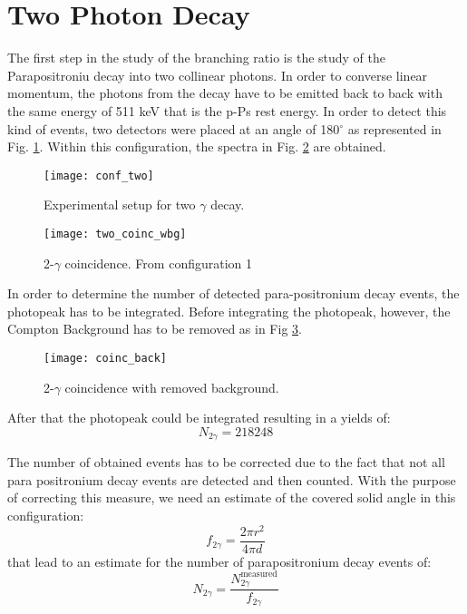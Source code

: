 \section*{Two Photon Decay}

The first step in the study of the branching ratio is the study of the Parapositroniu decay into two collinear photons. In order to converse linear momentum, the photons from the decay have to be emitted back to back with the same energy of 511 keV that is the p-Ps rest energy. In order to detect this kind of events, two detectors were placed at an angle of 180$^\circ$ as represented in Fig. \ref{Fig: exp setup for 2gamma}. Within this configuration, the spectra in Fig. \ref{Fig: 2gamma coinc with bg} are obtained.
\begin{figure}[H]
\centering
\texttt{[image: conf\_two]}
\caption{Experimental setup for two $\gamma$ decay.}
\label{Fig: exp setup for 2gamma}
\end{figure}

\begin{figure}[H]
\centering
\texttt{[image: two\_coinc\_wbg]}
\caption{2-$\gamma$ coincidence. From configuration 1}
\label{Fig: 2gamma coinc with bg}
\end{figure}

In order to determine the number of detected para-positronium decay events, the photopeak has to be integrated.
Before integrating the photopeak, however, the Compton Background has to be removed as in Fig \ref{Fig: removed compton back}.

\begin{figure}[H]
\centering
\texttt{[image: coinc\_back]}
\caption{2-$\gamma$ coincidence with removed background.}
\label{Fig: removed compton back}
\end{figure}

After that the photopeak could be integrated resulting in a yields of:
\begin{equation}
N_{2\gamma} = 218248
\end{equation} 

The number of obtained events has to be corrected due to the fact that not all para positronium decay events are detected and then counted. With the purpose of correcting this measure, we need an estimate of the covered solid angle in this configuration:
\begin{equation}
f_{2\gamma} = \dfrac{2\pi r^2}{4\pi d}
\end{equation}
that lead to an estimate for the number of parapositronium decay events of:
\begin{equation}
N_{2\gamma} = \dfrac{N_{2\gamma}^{\text{measured}}}{f_{2\gamma}}
\end{equation}




